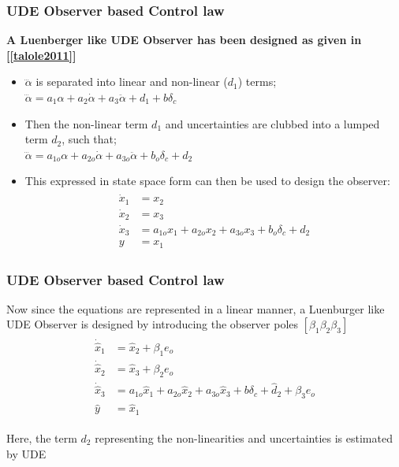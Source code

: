 \documentclass[table,10pt,red]{beamer}	%
\begin{document}
\begin{frame}
\frametitle{UDE Observer based Control law}
	\textbf{A Luenberger like UDE Observer has been designed as given in [\ref{talole2011}]}


\begin{itemize}  %
	\item $\dddot{\alpha}$ is separated into linear and non-linear ($d_1$) terms; $\dddot{\alpha} = a_1 \alpha + a_2 \dot{\alpha} + a_3 \ddot{\alpha} + d_1 + b\delta_c$
	
	\item Then the non-linear term $d_1$ and uncertainties are clubbed into a lumped term $d_2$, such that; \\
	$\dddot{\alpha} = a_{1o} \alpha + a_{2o} \dot{\alpha} + a_{3o} \ddot{\alpha} + b_o\delta_c + d_2$\\
	
	\item This expressed in state space form can then be used to design the observer:
	\begin{eqnarray*}
		\begin{aligned}
			\dot{x}_1 &= x_2 \\
			\dot{x}_2 &= x_3 \\
			\dot{x}_3 &= a_{1o}x_1 + a_{2o}x_2 + a_{3o}x_3 + b_o \delta_c + d_2 \\
			y &= x_1 \label{rx1}
		\end{aligned}
		\label{eq5}
	\end{eqnarray*}
	
\end{itemize}

\end{frame}

\begin{frame}
\frametitle{UDE Observer based Control law}

Now since the equations are represented in a linear manner, a Luenburger like UDE Observer is designed by introducing the observer poles $[\beta_1 \beta_2 \beta_3]$
\begin{eqnarray*}
	\begin{aligned}
		\dot{\hat{x}}_1 &= \hat{x}_2 + \beta_1 e_o\\
		\dot{\hat{x}}_2 &= \hat{x}_3 + \beta_2 e_o\\
		\dot{\hat{x}}_3 &= a_{1o}\hat{x}_1 + a_{2o}\hat{x}_2 + a_{3o}\hat{x}_3 + b \delta_c + \hat{d}_2 + \beta_3 e_o\\		
		\hat{y} &= \hat{x}_1 
	\end{aligned}
	\label{eq5}
\end{eqnarray*}

Here, the term $d_2$ representing the non-linearities and uncertainties is estimated by UDE

\end{frame}
\end{document}
